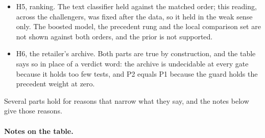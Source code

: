 \begin{itemize}
\item H5, ranking. The text classifier held against the matched order; this reading, across the challengers, was fixed after the data, so it held in the weak sense only. The boosted model, the precedent rung and the local comparison set are not shown against both orders, and the prior is not supported.
\item H6, the retailer's archive. Both parts are true by construction, and the table says so in place of a verdict word: the archive is undecidable at every gate because it holds too few tests, and P2 equals P1 because the guard holds the precedent weight at zero.
\end{itemize}
Several parts hold for reasons that narrow what they say, and the notes below give those reasons.

\paragraph{Notes on the table.}
